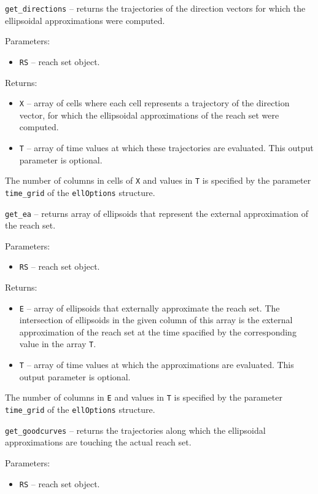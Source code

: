 \newpage

{\Large {\tt get\_directions}} -- returns the trajectories of the direction
vectors for which the ellipsoidal approximations were computed.

Parameters:
\begin{itemize}
\item {\tt RS} -- reach set object.
\end{itemize}

Returns:
\begin{itemize}
\item {\tt X} -- array of cells where each cell represents a trajectory
of the direction vector, for which the ellipsoidal approximations of the
reach set were computed.
\item {\tt T} -- array of time values at which these trajectories
are evaluated. This output parameter is optional.
\end{itemize}
The number of columns in cells of {\tt X} and values in {\tt T} is specified by
the parameter {\tt time\_grid} of the {\tt ellOptions} structure.

\newpage

{\Large {\tt get\_ea}} -- returns array of ellipsoids that represent the
external approximation of the reach set.

Parameters:
\begin{itemize}
\item {\tt RS} -- reach set object.
\end{itemize}

Returns:
\begin{itemize}
\item {\tt E} -- array of ellipsoids that externally approximate the reach set.
The intersection of ellipsoids in the given column of this array is
the external approximation of the reach set at the time spacified by the
corresponding value in the array {\tt T}.
\item {\tt T} -- array of time values at which the approximations
are evaluated. This output parameter is optional.
\end{itemize}
The number of columns in {\tt E} and values in {\tt T} is specified by
the parameter {\tt time\_grid} of the {\tt ellOptions} structure.

\newpage

{\Large {\tt get\_goodcurves}} -- returns the trajectories along which
the ellipsoidal approximations are touching the actual reach set.

Parameters:
\begin{itemize}
\item {\tt RS} -- reach set object.
\end{itemize}


